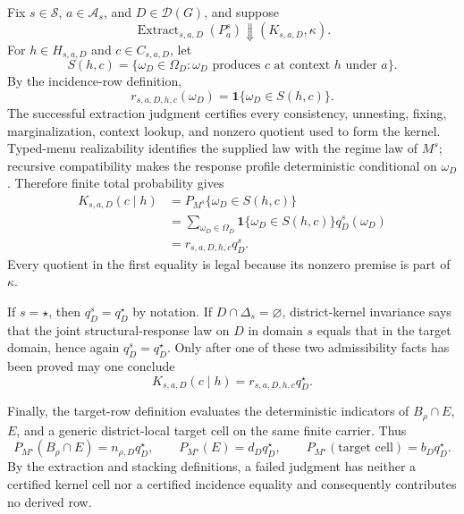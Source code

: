 Fix \(s\in\mathcal S\), \(a\in\mathcal A_s\), and \(D\in\mathcal D(G)\), and suppose
\[
\operatorname{Extract}_{s,a,D}(P_a^s)\Downarrow(K_{s,a,D},\kappa).
\]
For \(h\in H_{s,a,D}\) and \(c\in C_{s,a,D}\), let
\[
S(h,c)=\{\omega_D\in\Omega_D:\omega_D\text{ produces \(c\) at context \(h\) under \(a\)}\}.
\]
By the incidence-row definition,
\[
r_{s,a,D,h,c}(\omega_D)=\mathbf 1\{\omega_D\in S(h,c)\}.
\]
The successful extraction judgment certifies every consistency, unnesting, fixing, marginalization, context lookup, and nonzero quotient used to form the kernel. Typed-menu realizability identifies the supplied law with the regime law of \(M^s\); recursive compatibility makes the response profile deterministic conditional on \(\omega_D\). Therefore finite total probability gives
\[
\begin{aligned}
K_{s,a,D}(c\mid h)
&=P_{M^s}\{\omega_D\in S(h,c)\}\\
&=\sum_{\omega_D\in\Omega_D}
  \mathbf 1\{\omega_D\in S(h,c)\}q_D^s(\omega_D)\\
&=r_{s,a,D,h,c}q_D^s.
\end{aligned}
\]
Every quotient in the first equality is legal because its nonzero premise is part of \(\kappa\).

If \(s=\star\), then \(q_D^s=q_D^\star\) by notation. If \(D\cap\Delta_s=\varnothing\), district-kernel invariance says that the joint structural-response law on \(D\) in domain \(s\) equals that in the target domain, hence again \(q_D^s=q_D^\star\). Only after one of these two admissibility facts has been proved may one conclude
\[
K_{s,a,D}(c\mid h)=r_{s,a,D,h,c}q_D^\star.
\]

Finally, the target-row definition evaluates the deterministic indicators of \(B_\rho\cap E\), \(E\), and a generic district-local target cell on the same finite carrier. Thus
\[
P_{M^\star}(B_\rho\cap E)=n_{\rho,D}q_D^\star,
\qquad
P_{M^\star}(E)=d_Dq_D^\star,
\qquad
P_{M^\star}(\text{target cell})=b_Dq_D^\star.
\]
By the extraction and stacking definitions, a failed judgment has neither a certified kernel cell nor a certified incidence equality and consequently contributes no derived row.